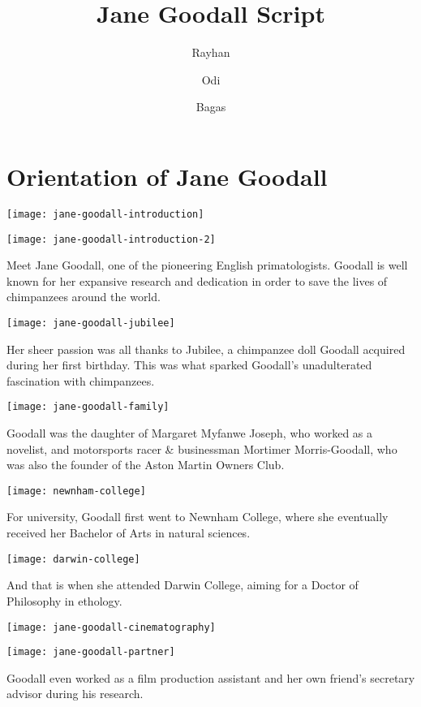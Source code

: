\documentclass[12pt]{report}
\title{Jane Goodall Script}
\author{Rayhan \and Odi \and Bagas}
\begin{document}
\maketitle

\centering

\section*{Orientation of Jane Goodall}

\texttt{[image: jane-goodall-introduction]}

\texttt{[image: jane-goodall-introduction-2]}

Meet Jane Goodall, one of the pioneering English primatologists. Goodall is
well known for her expansive research and dedication in order to save the lives
of chimpanzees around the world.

\texttt{[image: jane-goodall-jubilee]}

Her sheer passion was all thanks to Jubilee, a chimpanzee doll Goodall acquired
during her first birthday. This was what sparked Goodall's unadulterated
fascination with chimpanzees.

\texttt{[image: jane-goodall-family]}

Goodall was the daughter of Margaret Myfanwe Joseph, who worked as a novelist,
and motorsports racer \& businessman Mortimer Morris-Goodall, who was also the
founder of the Aston Martin Owners Club.

\pagebreak

\texttt{[image: newnham-college]}

For university, Goodall first went to Newnham College, where she eventually
received her Bachelor of Arts in natural sciences.

\texttt{[image: darwin-college]}

And that is when she attended Darwin College, aiming for a Doctor of Philosophy
in ethology.

\texttt{[image: jane-goodall-cinematography]}

\texttt{[image: jane-goodall-partner]}

Goodall even worked as a film production assistant and her own friend's
secretary advisor during his research.
\end{document}
